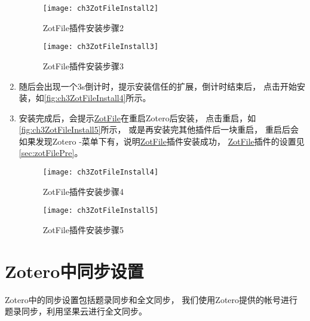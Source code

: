 \documentclass[cn,11pt,chinese]{elegantbook}
\begin{document}
\begin{enumerate}
			\begin{figure}[htbp]
				\begin{minipage}[t]{0.6\linewidth}
					\centering
					\texttt{[image: ch3ZotFileInstall2]}
					\caption{ZotFile插件安装步骤2}
					\label{fig:ch3ZotFileInstall2}
				\end{minipage}
				\begin{minipage}[t]{0.3\linewidth}
					\centering
					\texttt{[image: ch3ZotFileInstall3]}
					\caption{ZotFile插件安装步骤3}
					\label{fig:ch3ZotFileInstall3}
				\end{minipage}
			\end{figure}
			\item
			随后会出现一个3s倒计时，提示安装信任的扩展，倒计时结束后，
			点击开始安装，如\autoref{fig:ch3ZotFileInstall4}所示。
			\item
			安装完成后，会提示\href{http://zotfile.com/}{ZotFile}在重启Zotero后安装，
			点击重启，如\autoref{fig:ch3ZotFileInstall5}所示，
			或是再安装完其他插件后一块重启，
			重启后会如果发现Zotero -菜单下有，说明\href{http://zotfile.com/}{ZotFile}插件安装成功，
			\href{http://zotfile.com/}{ZotFile}插件的设置见\cref{sec:zotFilePre}。
			\begin{figure}[htbp]
				\centering
				\texttt{[image: ch3ZotFileInstall4]}
				\caption{ZotFile插件安装步骤4}
				\label{fig:ch3ZotFileInstall4}
			\end{figure}
			
			\begin{figure}[htbp]
				\centering
				\texttt{[image: ch3ZotFileInstall5]}
				\caption{ZotFile插件安装步骤5}
				\label{fig:ch3ZotFileInstall5}
			\end{figure}
		\end{enumerate}
		
	\section{Zotero中同步设置}\label{sec:syn}
		Zotero中的同步设置包括题录同步和全文同步，
		我们使用Zotero提供的帐号进行题录同步，利用坚果云进行全文同步。
		
\end{document}
